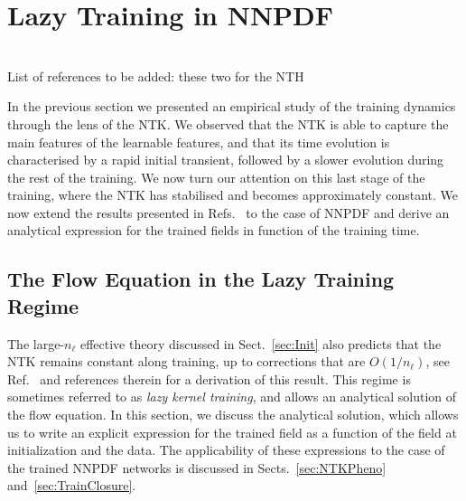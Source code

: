 \section{Lazy Training in NNPDF}
\label{sec:LazyTraining}

\begin{center}
  \\
  List of references to be added: these two for the NTH
  \cite{huang2019ddnn}\cite{Dyer:2019uzd}
\end{center}

In the previous section we presented an empirical study of the training dynamics
through the lens of the NTK. We observed that the NTK is able to capture the
main features of the learnable features, and that its time evolution is
characterised by a rapid initial transient, followed by a slower evolution
during the rest of the training. We now turn our attention on this last stage of
the training, where the NTK has stabilised and becomes approximately constant.
We now extend the results presented in Refs.~\cite{jacot2018neural,lee2019wide}
to the case of NNPDF and derive an analytical expression for the trained fields
in function of the training time.

\subsection{The Flow Equation in the Lazy Training Regime}
\label{sec:Lazy}

The large-$n_{\ell}$ effective theory discussed in Sect.~\ref{sec:Init} also predicts that
the NTK remains constant along training, up to corrections that are $O(1/n_{\ell})$, see
Ref.~\cite{DBLP:journals/corr/abs-1806-07572} and references therein for a derivation of this result.
This regime is sometimes referred to as {\em lazy kernel training}, and allows an analytical
solution of the flow equation. In this section, we discuss the analytical solution, which allows us 
to write an explicit expression for the trained field as a function of the field at initialization and the data. 
The applicability of these expressions to the case of the trained NNPDF networks is discussed in 
Sects.~\ref{sec:NTKPheno} and~\ref{sec:TrainClosure}.

